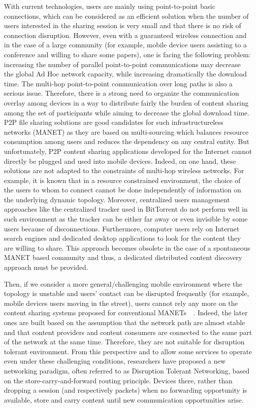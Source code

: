 With current technologies, users are mainly using point-to-point basic connections, which can be considered as an efficient solution when the number of users interested in the sharing session is very small and that there is no risk of connection disruption. However, even with a guaranteed wireless connection and in the case of a large community (for example, mobile device users assisting to a conference and willing to share some papers), one is facing the following problem: increasing the number of parallel point-to-point communications may decrease the global Ad Hoc network capacity, while increasing dramatically the download time. The multi-hop point-to-point communication over long paths is also a serious issue. Therefore, there is a strong need to organize the communication overlay among devices in a way to distribute fairly the burden of content sharing among the set of participants while aiming to decrease the global download time. P2P file sharing solutions are good candidates for such infrastructureless networks (MANET) as they are based on multi-sourcing which balances resource consumption among users and reduces the dependency on any central entity. But unfortunately, P2P content sharing applications developed for the Internet cannot directly be plugged and used into mobile devices. Indeed, on one hand, these solutions are not adapted to the constraints of multi-hop wireless networks. For example, it is known that in a resource constrained environment, the choice of the users to whom to connect cannot be done independently of information on the underlying dynamic topology. Moreover, centralized users management approaches like the centralized tracker used in BitTorrent do not perform well in such environment as the tracker can be either far away or even invisible by some users because of disconnections. Furthermore, computer users rely on Internet search engines and dedicated desktop applications to look for the content they are willing to share. This approach becomes obsolete in the case of a spontaneous MANET based community and thus, a dedicated distributed content discovery approach must be provided. 

Then, if we consider a more general/challenging mobile environment where the topology is unstable and users' contact can be disrupted frequently (for example, mobile devices users moving in the street), users cannot rely any more on the content sharing systems proposed for conventional MANETs~\cite{BitHoc}~\cite{BlueTorrent}. Indeed, the later ones are built based on the assumption that the network path are almost stable and that content providers and content consumers are connected to the same part of the network at the same time. Therefore, they are not suitable for disruption tolerant environment. From this perspective and to allow some services to operate even under these challenging conditions, researchers have proposed a new networking paradigm, often referred to as Disruption Tolerant Networking, based on the store-carry-and-forward routing principle. Devices there, rather than dropping a session (and respectively packets) when no forwarding opportunity is available, store and carry content until new communication opportunities arise. 

